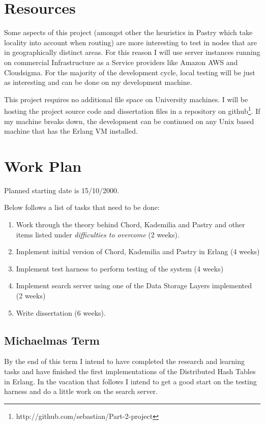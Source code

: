 \section*{Resources}

Some aspects of this project (amongst other the heuristics in Pastry which take locality into account when routing) are more interesting to test in nodes that are in geographically distinct areas. For this reason I will use server instances running on commercial Infrastructure as a Service providers like Amazon AWS and Cloudsigma. For the majority of the development cycle, local testing will be just as interesting and can be done on my development machine.

This project requires no additional file space on University machines. I will be hosting the project source code and dissertation files in a repository on github\footnote{http://github.com/sebastian/Part-2-project}.
If my machine breaks down, the development can be continued on any Unix based machine that has the Erlang VM installed.

\section*{Work Plan}

Planned starting date is 15/10/2000. 

Below follows a list of tasks that need to be done:

\begin{enumerate}
  \item Work through the theory behind Chord, Kademilia and Pastry and other items listed under \emph{difficulties to overcome} (2 weeks).
  \item Implement initial version of Chord, Kademilia and Pastry in Erlang (4 weeks)
  \item Implement test harness to perform testing of the system (4 weeks)
  \item Implement search server using one of the Data Storage Layers implemented (2 weeks)
  \item Write dissertation (6 weeks).
\end{enumerate}

\subsection*{Michaelmas Term} 

By the end of this term I intend to have completed the research and learning tasks and have finished the first implementations of the Distributed Hash Tables in Erlang. In the vacation that follows I intend to get a good start on the testing harness and do a little work on the search server.


